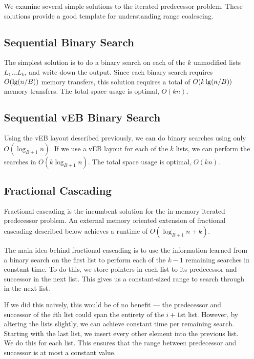 We examine several simple solutions to the iterated predecessor problem. 
These solutions provide a good template for understanding range coalescing.

\subsection*{Sequential Binary Search}
The simplest solution is to do a binary search on each of the $k$ unmodified lists 
$L_1 \ldots L_k$, and write 
down the output. Since each binary search requires $O(\lg \mathopen{}\left(n/B\right)\mathclose{})$ memory transfers, 
this solution requires a total of $O(k \lg \mathopen{}\left(n/B\right)\mathclose{})$ memory transfers. The total space 
usage is optimal, $O(kn)$.

\subsection*{Sequential vEB Binary Search}
Using the vEB layout described previously, we can do binary searches using only 
$O(\log_{B+1} n)$. If we use a vEB layout for each of the $k$ lists, we can perform 
the searches in $O(k \log_{B+1} n)$. The total space usage is optimal, $O(kn)$.

\subsection*{Fractional Cascading}
Fractional cascading is the incumbent solution for the in-memory iterated 
predecessor problem. An external memory oriented extension of fractional cascading
described below achieves a runtime of $O(\log_{B+1} n + k)$.

The main idea behind fractional cascading is to use the information learned from 
a binary search on the first list to perform each of the $k-1$ remaining searches in 
constant time. To do this, we store pointers in each list to its predecessor and 
successor in the next list. This gives us a constant-sized range to 
search through in the next list.

If we did this naively, this would be of no benefit --- the predecessor and 
successor of the $i$th list could span the entirety of the $i+1$st list. 
However, by altering the lists slightly, 
we can achieve constant time per remaining search. Starting with the last list, 
we insert every other element into the previous list. We do this for each list. 
This ensures that the range between predecessor and successor is at most a constant value.

